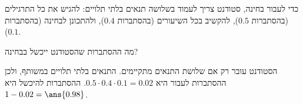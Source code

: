כדי לעבור בחינה, סטודנט צריך לעמוד בשלושה תנאים בלתי תלויים: להגיש את כל התרגילים (בהסתברות $0.5$), להקשיב בכל השיעורים (בהסתברות $0.4$), ולהתכונן לבחינה (בהסתברות $0.1$).

מה ההסתברות שהסטודנט ייכשל בבחינה?
\begin{solbox}
הסטודנט עובר רק אם שלושת התנאים מתקיימים. התנאים בלתי תלויים במשותף, ולכן ההסתברות לעבור היא $0.5\cdot0.4\cdot0.1=0.02$. ההסתברות להיכשל היא $1-0.02=\ans{0.98}$.
\end{solbox}

